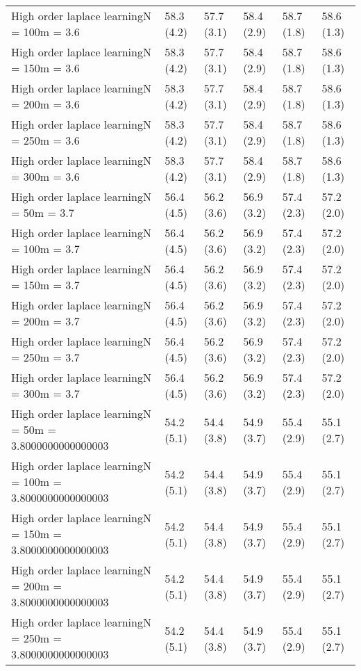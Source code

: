 \documentclass{article}
\begin{document}
\begin{table*}[t!]
\begin{center}
\begin{small}
\begin{sc}
\begin{tabular}{llllll}
High order laplace learningN = 100m = 3.6&58.3 (4.2)      &57.7 (3.1)      &58.4 (2.9)      &58.7 (1.8)      &58.6 (1.3)      \\
High order laplace learningN = 150m = 3.6&58.3 (4.2)      &57.7 (3.1)      &58.4 (2.9)      &58.7 (1.8)      &58.6 (1.3)      \\
High order laplace learningN = 200m = 3.6&58.3 (4.2)      &57.7 (3.1)      &58.4 (2.9)      &58.7 (1.8)      &58.6 (1.3)      \\
High order laplace learningN = 250m = 3.6&58.3 (4.2)      &57.7 (3.1)      &58.4 (2.9)      &58.7 (1.8)      &58.6 (1.3)      \\
High order laplace learningN = 300m = 3.6&58.3 (4.2)      &57.7 (3.1)      &58.4 (2.9)      &58.7 (1.8)      &58.6 (1.3)      \\
High order laplace learningN = 50m = 3.7&56.4 (4.5)      &56.2 (3.6)      &56.9 (3.2)      &57.4 (2.3)      &57.2 (2.0)      \\
High order laplace learningN = 100m = 3.7&56.4 (4.5)      &56.2 (3.6)      &56.9 (3.2)      &57.4 (2.3)      &57.2 (2.0)      \\
High order laplace learningN = 150m = 3.7&56.4 (4.5)      &56.2 (3.6)      &56.9 (3.2)      &57.4 (2.3)      &57.2 (2.0)      \\
High order laplace learningN = 200m = 3.7&56.4 (4.5)      &56.2 (3.6)      &56.9 (3.2)      &57.4 (2.3)      &57.2 (2.0)      \\
High order laplace learningN = 250m = 3.7&56.4 (4.5)      &56.2 (3.6)      &56.9 (3.2)      &57.4 (2.3)      &57.2 (2.0)      \\
High order laplace learningN = 300m = 3.7&56.4 (4.5)      &56.2 (3.6)      &56.9 (3.2)      &57.4 (2.3)      &57.2 (2.0)      \\
High order laplace learningN = 50m = 3.8000000000000003&54.2 (5.1)      &54.4 (3.8)      &54.9 (3.7)      &55.4 (2.9)      &55.1 (2.7)      \\
High order laplace learningN = 100m = 3.8000000000000003&54.2 (5.1)      &54.4 (3.8)      &54.9 (3.7)      &55.4 (2.9)      &55.1 (2.7)      \\
High order laplace learningN = 150m = 3.8000000000000003&54.2 (5.1)      &54.4 (3.8)      &54.9 (3.7)      &55.4 (2.9)      &55.1 (2.7)      \\
High order laplace learningN = 200m = 3.8000000000000003&54.2 (5.1)      &54.4 (3.8)      &54.9 (3.7)      &55.4 (2.9)      &55.1 (2.7)      \\
High order laplace learningN = 250m = 3.8000000000000003&54.2 (5.1)      &54.4 (3.8)      &54.9 (3.7)      &55.4 (2.9)      &55.1 (2.7)      \\

\end{tabular}
\end{sc}
\end{small}
\end{center}
\end{table*}
\end{document}
